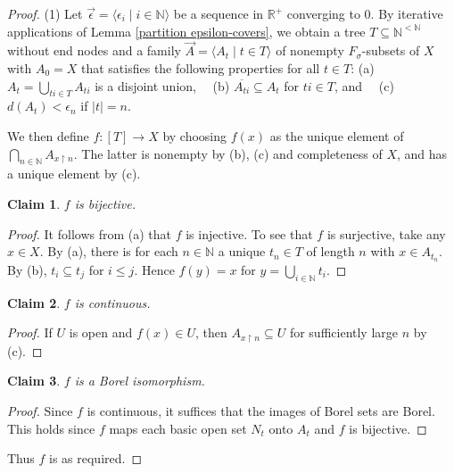 \documentclass[10pt]{amsart}
\newcommand{\RR}{\mathbb{R}}
\newcommand{\NN}{\mathbb{N}}
\newtheorem*{claim*}{Claim}
\theoremstyle{definition}
\theoremstyle{remark}
\newenvironment{enumerate-(a)}{\begin{enumerate}[label={\upshape (\alph*)}, leftmargin=2pc]}{\end{enumerate}}
\begin{document}
\begin{proof} 
(1) 
Let $\vec{\epsilon}=\langle \epsilon_i \mid i\in\NN\rangle$ be a sequence in $\RR^+$ converging to $0$. 
By iterative applications of Lemma \ref{partition epsilon-covers}, we obtain a tree $T\subseteq \NN^{<\NN}$ without end nodes and a family $\vec{A}=\langle A_t\mid t\in T\rangle$ of nonempty $F_\sigma$-subsets of $X$ with $A_0=X$ that satisfies the following properties for all $t\in T$: 
(a) $A_t=\bigcup_{ti \in T} A_{ti}$ is a disjoint union, \ \ (b) $\overline{A_{ti}} \subseteq A_t$ for $ti\in T$, and \ \ (c) $d(A_t)<\epsilon_n$ if $|t|=n$. 

We then define $f\colon [T]\rightarrow X$ by choosing $f(x)$ as the unique element of $\bigcap_{n\in\NN} A_{x\upharpoonright n}$. 
The latter is nonempty by (b), (c) and completeness of $X$, and has a unique element by (c). 

\begin{claim*} 
$f$ is bijective. 
\end{claim*} 
\begin{proof} 
It follows from (a) that $f$ is injective. 
To see that $f$ is surjective, take any $x\in X$. 
By (a), there is for each $n\in\NN$ a unique $t_n\in T$ of length $n$ with $x\in A_{t_n}$. 
By (b), $t_i\subseteq t_j$ for $i\leq j$. 
Hence $f(y)=x$ for $y=\bigcup_{i\in\NN} t_i$. 
\end{proof} 

\begin{claim*} 
$f$ is continuous. 
\end{claim*} 
\begin{proof} 
If $U$ is open and $f(x)\in U$, then $A_{x{\upharpoonright}n}\subseteq U$ for sufficiently large $n$ by (c). 
\end{proof} 

\begin{claim*} 
$f$ is a Borel isomorphism. 
\end{claim*} 
\begin{proof} 
Since $f$ is continuous, it suffices that the images of Borel sets are Borel. 
This holds since $f$ maps each basic open set $N_t$ onto $A_t$ and $f$ is bijective. 
\end{proof} 
Thus $f$ is as required. 


\end{proof}
\end{document}
